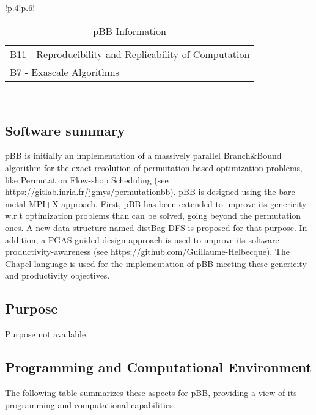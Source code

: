 \begin{table}[h!]
{{\begin{tabular}{!{\color{numpexgray}\vrule}p{.4\textwidth}!{\color{numpexgray}\vrule}p{.6\textwidth}!{\color{numpexgray}\vrule}}
\begin{tabular}{l}
B11 - Reproducibility and Replicability of Computation\\
B7 - Exascale Algorithms\\
\end{tabular} \\
        \bottomrule
    \end{tabular}
    }}
    \caption{pBB Information}
\end{table}

\subsection{Software summary}
\label{sec:pBB:summary}

pBB is initially an implementation of a massively parallel Branch\&Bound algorithm for the exact resolution of permutation-based optimization problems, like Permutation Flow-shop Scheduling (see https://gitlab.inria.fr/jgmys/permutationbb). pBB is designed using the bare-metal MPI+X approach. First, pBB has been extended to improve its genericity w.r.t optimization problems than can be solved, going beyond the permutation ones. A new data structure named distBag-DFS is proposed for that purpose. In addition, a PGAS-guided design approach is used to improve its software productivity-awareness (see https://github.com/Guillaume-Helbecque). The Chapel language is used for the implementation of pBB meeting these genericity and productivity objectives. 

\subsection{Purpose}
\label{sec:pBB:purpose}
Purpose not available.

\subsection{Programming and Computational Environment}
\label{sec::pBB:environment_capabilities}


The following table summarizes these aspects for pBB, providing a  view of its programming and computational capabilities.

